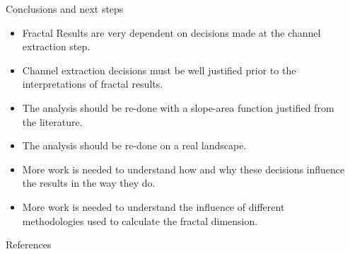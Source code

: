 \documentclass[final]{beamer}
\newlength{\sepwidth}
\newlength{\colwidth}
\newcommand{\separatorcolumn}{\begin{column}{\sepwidth}\end{column}}
\begin{document}
\begin{frame}[t]
\begin{columns}[t]
\begin{column}{\colwidth}
\begin{alertblock}{Conclusions and next steps}
    \begin{itemize}
        \item Fractal Results are very dependent on decisions made at the channel extraction step.
        \item Channel extraction decisions must be well justified prior to the interpretations of fractal results.
        \item The analysis should be re-done with a slope-area function justified from the literature.
        \item The analysis should be re-done on a real landscape.
        \item More work is needed to understand how and why these decisions influence the results in the way they do.
        \item More work is needed to understand the influence of different methodologies used to calculate the fractal dimension.
    \end{itemize}
\end{alertblock}

  \begin{block}{References}

    \nocite{*}
    \footnotesize{}

  \end{block}

\end{column}

\separatorcolumn
\end{columns}
\end{frame}
\end{document}
